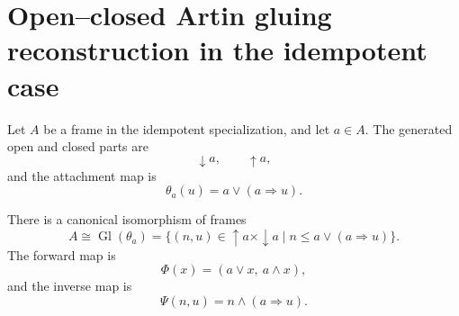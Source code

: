 \section{Open--closed Artin gluing reconstruction in the idempotent case}
\label{sec:idempotent-open-closed-artin-gluing}

Let \(A\) be a frame in the idempotent specialization, and let \(a\in A\).  The
generated open and closed parts are
\[
    \downarrow a,
    \qquad
    \uparrow a,
\]
and the attachment map is
\[
    \theta_a(u)=a\vee(a\Rightarrow u).
\]

\begin{theorem}
\label{thm:idempotent-open-closed-gluing-reconstruction}
There is a canonical isomorphism of frames
\[
    A
    \cong
    \operatorname{Gl}(\theta_a)
    =
    \{(n,u)\in\uparrow a\times\downarrow a
      \mid n\leq a\vee(a\Rightarrow u)\}.
\]
The forward map is
\[
    \Phi(x)=(a\vee x,\ a\wedge x),
\]
and the inverse map is
\[
    \Psi(n,u)=n\wedge(a\Rightarrow u).
\]
\end{theorem}

